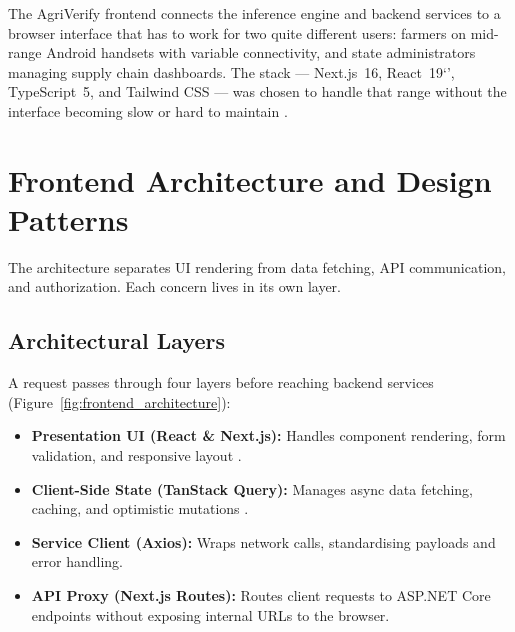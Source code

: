 
The AgriVerify frontend connects the inference engine and backend services to a browser interface that has to work for two quite different users: farmers on mid-range Android handsets with variable connectivity, and state administrators managing supply chain dashboards. The stack --- Next.js~16, React~19`', TypeScript~5, and Tailwind CSS --- was chosen to handle that range without the interface becoming slow or hard to maintain \cite{salim2024microservices, singh2026impact}.

\section{Frontend Architecture and Design Patterns}
\label{sec:frontend-architecture}

The architecture separates UI rendering from data fetching, API communication, and authorization. Each concern lives in its own layer.

\subsection{Architectural Layers}
A request passes through four layers before reaching backend services (Figure~\ref{fig:frontend_architecture}):
\begin{itemize}
    \item \textbf{Presentation UI (React \& Next.js):} Handles component rendering, form validation, and responsive layout \cite{react2024}.
    \item \textbf{Client-Side State (TanStack Query):} Manages async data fetching, caching, and optimistic mutations \cite{tanstack2024}.
    \item \textbf{Service Client (Axios):} Wraps network calls, standardising payloads and error handling.
    \item \textbf{API Proxy (Next.js Routes):} Routes client requests to ASP.NET Core endpoints without exposing internal URLs to the browser.
\end{itemize}

